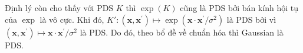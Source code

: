 Định lý còn cho thấy với  PDS $K$ thì $\exp(K)$ cũng là PDS bởi bán
kính hội tụ của $\exp$ là vô cực. Khi đó,  $K': (\mathbf{x},
\mathbf{x}^\prime) \mapsto \exp(\mathbf{x}\cdot \mathbf{x}^\prime / \sigma^2)$
là PDS bởi vì $(\mathbf{x}, \mathbf{x}^\prime) \mapsto \mathbf{x}\cdot
\mathbf{x}^\prime / \sigma^2$ là PDS. Do đó, theo bổ đề về  chuẩn
hóa thì  Gaussian là PDS.
